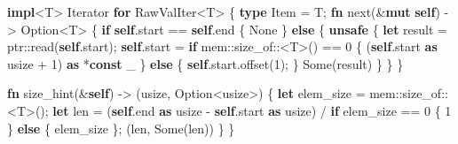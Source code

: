 \documentclass[a4paper,]{book}
\newenvironment{Shaded}{\begin{snugshade}}{\end{snugshade}}
\newcommand{\KeywordTok}[1]{\textcolor[rgb]{0.13,0.29,0.53}{\textbf{{#1}}}}
\newcommand{\DataTypeTok}[1]{\textcolor[rgb]{0.13,0.29,0.53}{{#1}}}
\newcommand{\DecValTok}[1]{\textcolor[rgb]{0.00,0.00,0.81}{{#1}}}
\newcommand{\ConstantTok}[1]{\textcolor[rgb]{0.00,0.00,0.00}{{#1}}}
\newcommand{\BuiltInTok}[1]{{#1}}
\newcommand{\NormalTok}[1]{{#1}}
\begin{document}
\begin{Shaded}
\begin{Highlighting}[]
\KeywordTok{impl}\NormalTok{<T> }\BuiltInTok{Iterator} \KeywordTok{for} \NormalTok{RawValIter<T> \{}
    \KeywordTok{type} \NormalTok{Item = T;}
    \KeywordTok{fn} \NormalTok{next(&}\KeywordTok{mut} \KeywordTok{self}\NormalTok{) -> }\DataTypeTok{Option}\NormalTok{<T> \{}
        \KeywordTok{if} \KeywordTok{self}\NormalTok{.start == }\KeywordTok{self}\NormalTok{.end \{}
            \ConstantTok{None}
        \NormalTok{\} }\KeywordTok{else} \NormalTok{\{}
            \KeywordTok{unsafe} \NormalTok{\{}
                \KeywordTok{let} \NormalTok{result = ptr::read(}\KeywordTok{self}\NormalTok{.start);}
                \KeywordTok{self}\NormalTok{.start = }\KeywordTok{if} \NormalTok{mem::size_of::<T>() == }\DecValTok{0} \NormalTok{\{}
                    \NormalTok{(}\KeywordTok{self}\NormalTok{.start }\KeywordTok{as} \DataTypeTok{usize} \NormalTok{+ }\DecValTok{1}\NormalTok{) }\KeywordTok{as} \NormalTok{*}\KeywordTok{const} \NormalTok{_}
                \NormalTok{\} }\KeywordTok{else} \NormalTok{\{}
                    \KeywordTok{self}\NormalTok{.start.offset(}\DecValTok{1}\NormalTok{);}
                \NormalTok{\}}
                \ConstantTok{Some}\NormalTok{(result)}
            \NormalTok{\}}
        \NormalTok{\}}
    \NormalTok{\}}

    \KeywordTok{fn} \NormalTok{size_hint(&}\KeywordTok{self}\NormalTok{) -> (}\DataTypeTok{usize}\NormalTok{, }\DataTypeTok{Option}\NormalTok{<}\DataTypeTok{usize}\NormalTok{>) \{}
        \KeywordTok{let} \NormalTok{elem_size = mem::size_of::<T>();}
        \KeywordTok{let} \NormalTok{len = (}\KeywordTok{self}\NormalTok{.end }\KeywordTok{as} \DataTypeTok{usize} \NormalTok{- }\KeywordTok{self}\NormalTok{.start }\KeywordTok{as} \DataTypeTok{usize}\NormalTok{)}
                  \NormalTok{/ }\KeywordTok{if} \NormalTok{elem_size == }\DecValTok{0} \NormalTok{\{ }\DecValTok{1} \NormalTok{\} }\KeywordTok{else} \NormalTok{\{ elem_size \};}
        \NormalTok{(len, }\ConstantTok{Some}\NormalTok{(len))}
    \NormalTok{\}}
\NormalTok{\}}


\end{Highlighting}
\end{Shaded}
\end{document}

